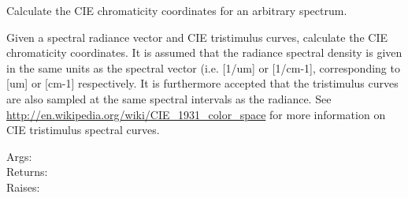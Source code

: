\documentclass[a4paper,10pt,english]{sphinxmanual}
\begin{document}
\begin{fulllineitems}
\label{rychroma:pyradi.rychroma.chromaticityforSpectralL}
Calculate the CIE chromaticity coordinates for an arbitrary spectrum.

Given a spectral radiance vector and CIE tristimulus curves,
calculate the CIE chromaticity coordinates. It is assumed that the
radiance spectral density is given in the same units as the spectral
vector (i.e. {[}1/um{]} or {[}1/cm-1{]}, corresponding to {[}um{]} or {[}cm-1{]} respectively.
It is furthermore accepted that the tristimulus curves are also sampled at
the same spectral intervals as the radiance. See
\href{http://en.wikipedia.org/wiki/CIE\_1931\_color\_space}{http://en.wikipedia.org/wiki/CIE\_1931\_color\_space}
for more information on CIE tristimulus spectral curves.
\begin{description}
\item[{Args:}] \leavevmode
{}

\item[{Returns:}] \leavevmode
{}

\item[{Raises:}] \leavevmode
{}

\end{description}

\end{fulllineitems}
\end{document}
